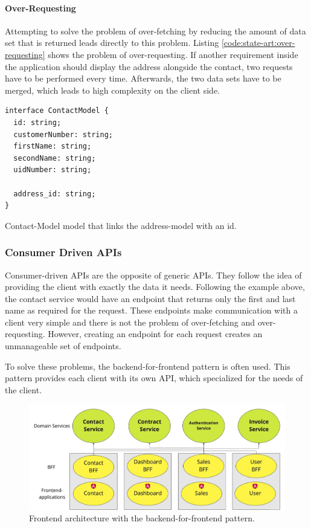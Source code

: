 \paragraph{Over-Requesting}

Attempting to solve the problem of over-fetching by reducing the amount of data set that is returned leads directly to this problem. Listing \ref{code:state-art:over-requesting} shows the problem of over-requesting. If another requirement inside the application should display the address alongside the contact, two requests have to be performed every time. Afterwards, the two data sets have to be merged, which leads to high complexity on the client side. \cite{misc:2019:leitner:backend-for-frontends}

\ifshowListings
\begin{listing}[H]
\begin{verbatim}
interface ContactModel {
  id: string;
  customerNumber: string;
  firstName: string;
  secondName: string;
  uidNumber: string;

  address_id: string;
}
\end{verbatim}
\caption{Contact-Model model that links the address-model with an id.}\label{code:state-art:over-requesting}
\end{listing}
\fi

\subsubsection{Consumer Driven APIs}

Consumer-driven APIs are the opposite of generic APIs. They follow the idea of providing the client with exactly the data it needs. Following the example above, the contact service would have an endpoint that returns only the first and last name as required for the request. These endpoints make communication with a client very simple and there is not the problem of over-fetching and over-requesting. However, creating an endpoint for each request creates an unmanageable set of endpoints. \cite{misc:2019:leitner:backend-for-frontends}


To solve these problems, the backend-for-frontend pattern is often used. This pattern provides each client with its own API, which specialized for the needs of the client. \cite{book:2018:richardson:background:bff:microservices-patterns}

\ifshowImages
\begin{figure}[H]
\centering
\includegraphics[width=0.8\linewidth]{images/ui-bff-architecture.jpeg}
\caption{Frontend architecture with the backend-for-frontend pattern.}\label{figure:state-of-the-art:ui-bff-architecture}
\end{figure}
\fi

